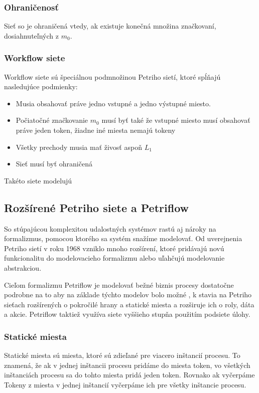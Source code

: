 \subsubsection{Ohraničenosť}
Sieť so je ohraničená vtedy, ak existuje konečná množina značkovaní, dosiahnuteľných z $m_0$.

\subsubsection{Workflow siete}
Workflow siete sú špeciálnou podmnožinou Petriho sietí, ktoré spĺňajú nasledujúce podmienky:
\begin{itemize}
\item Musia obsahovať práve jedno vstupné a jedno výstupné miesto.
\item Počiatočné značkovanie $m_0$ musí byť také že vstupné miesto musí obsahovať práve jeden token, žiadne iné miesta nemajú tokeny
\item Všetky prechody musia mať živosť aspoň $L_1$ 
\item Sieť musí byť ohraničená
\end{itemize}
Takéto siete modelujú 

\subsection{Rozšírené Petriho siete a Petriflow}

So stúpajúcou komplexitou udalostných systémov rastú aj nároky na formalizmus, pomocou ktorého sa systém snažíme modelovať. 
Od uverejnenia Petriho sietí v roku 1968 vzniklo mnoho rozšírení, ktoré pridávajú novú funkcionalitu do modelovacieho formalizmu alebo uľahčujú modelovanie abstrakciou. 

Cieľom formalizmu Petriflow je modelovať bežné biznis procesy dostatočne podrobne na to aby na základe týchto modelov bolo možné , k stavia na Petriho sieťach rozšírených o pokročilé hrany a statické miesta a rozširuje ich o roly, dáta a akcie. Petriflow taktiež využíva siete vyššieho stupňa použitím podsiete úlohy.



\subsubsection{Statické miesta}
Statické miesta sú miesta, ktoré sú zdieľané pre viacero inštancií procesu.  To znamená, že ak v jednej inštancii procesu pridáme do miesta token, vo všetkých inštanciách procesu sa do tohto miesta pridá jeden token. Rovnako ak vyčerpáme Tokeny z miesta v jednej inštancií vyčerpáme ich pre všetky inštancie procesu. 

